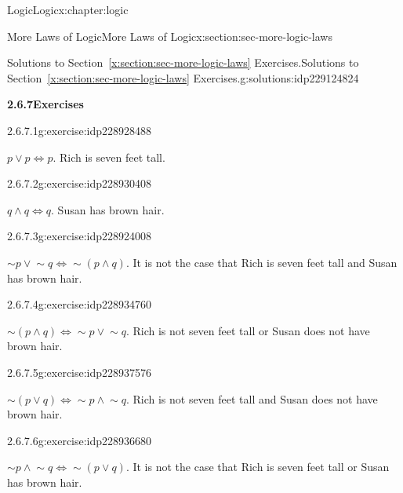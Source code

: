 \documentclass[twoside,10pt,]{book}
\newcommand{\xreffont}{\relax}
\numberwithin{equation}{section}
\begin{document}
\begin{chapterptx}{Logic}{}{Logic}{}{}{x:chapter:logic}
\begin{sectionptx}{More Laws of Logic}{}{More Laws of Logic}{}{}{x:section:sec-more-logic-laws}
\begin{solutions-subsection}{Solutions to Section~{\xreffont\ref*{x:section:sec-more-logic-laws}} Exercises.}{}{Solutions to Section~{\xreffont\ref*{x:section:sec-more-logic-laws}} Exercises.}{}{}{g:solutions:idp229124824}
\par\medskip
\noindent\textbf{\normalsize{}2.6.7\space\textperiodcentered\space{}Exercises}
\begin{exercisegroup}
\begin{divisionsolutioneg}{2.6.7.1}{}{g:exercise:idp228928488}%
\par\smallskip%
\noindent\hypertarget{g:solution:idp228928616-main}{}\(p {\vee}{} p  {\Leftrightarrow}{}  p\).  Rich is seven feet tall.\end{divisionsolutioneg}%
\begin{divisionsolutioneg}{2.6.7.2}{}{g:exercise:idp228930408}%
\par\smallskip%
\noindent\hypertarget{g:solution:idp228927208-main}{}\(q  {\wedge}{}  q  {\Leftrightarrow}{}  q\).  Susan has brown hair.\end{divisionsolutioneg}%
\begin{divisionsolutioneg}{2.6.7.3}{}{g:exercise:idp228924008}%
\par\smallskip%
\noindent\hypertarget{g:solution:idp228934504-main}{}\(\sim\!{p}{} {\vee}{} \sim\!{q}{}  {\Leftrightarrow}{}  \sim\!{(p {\wedge}{} q)}\).  It is not the case that Rich is seven feet tall and Susan has brown hair.\end{divisionsolutioneg}%
\begin{divisionsolutioneg}{2.6.7.4}{}{g:exercise:idp228934760}%
\par\smallskip%
\noindent\hypertarget{g:solution:idp228939880-main}{}\(\sim\!{(p {\wedge}{} q)} {\Leftrightarrow}{} \sim\!{p}{} {\vee}{}  \sim\!{q}{}\).  Rich is not seven feet tall or Susan does not have brown hair.\end{divisionsolutioneg}%
\begin{divisionsolutioneg}{2.6.7.5}{}{g:exercise:idp228937576}%
\par\smallskip%
\noindent\hypertarget{g:solution:idp228934376-main}{}\(\sim\!{(p {\vee}{} q)}  {\Leftrightarrow}{}  \sim\!{p}{} {\wedge}{}  \sim\!{q}{}\).  Rich is not seven feet tall and Susan does not have brown hair.\end{divisionsolutioneg}%
\begin{divisionsolutioneg}{2.6.7.6}{}{g:exercise:idp228936680}%
\par\smallskip%
\noindent\hypertarget{g:solution:idp228936552-main}{}\(\sim\!{p}{} {\wedge}{}  \sim\!{q}{}    {\Leftrightarrow}{}  \sim\!{(p {\vee}{} q)}\).  It is not the case that Rich is seven feet tall or Susan has brown hair.\end{divisionsolutioneg}%

\end{exercisegroup}
\end{solutions-subsection}
\end{sectionptx}
\end{chapterptx}
\end{document}
